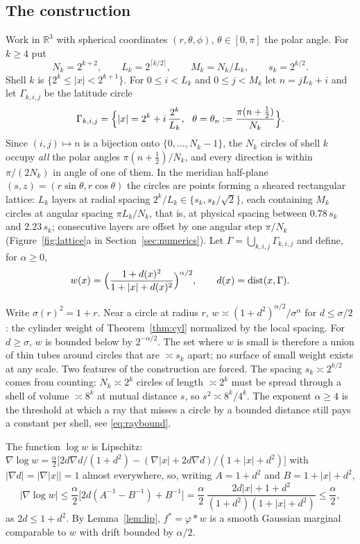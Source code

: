 \documentclass[11pt]{amsart}
\newcommand{\R}{\mathbb{R}}
\newcommand{\abs}[1]{\lvert #1\rvert}
\DeclareMathOperator{\dist}{dist}
\theoremstyle{plain}
\theoremstyle{definition}
\theoremstyle{remark}
\begin{document}
\subsection{The construction}\label{sec:construction}
Work in $\R^3$ with spherical coordinates $(r,\theta,\phi)$, $\theta\in[0,\pi]$
the polar angle. For $k\ge4$ put
\[
N_k=2^{k+2},\qquad L_k=2^{\lceil k/2\rceil},\qquad M_k=N_k/L_k,\qquad
s_k=2^{k/2}.
\]
Shell $k$ is $\{2^k\le\abs x<2^{k+1}\}$. For $0\le i<L_k$ and $0\le j<M_k$ let
$n=jL_k+i$ and let $\Gamma_{k,i,j}$ be the latitude circle
\[
\Gamma_{k,i,j}=\Bigl\{\abs x=2^k+i\,\frac{2^k}{L_k},\ \ \theta=\theta_n:=
\frac{\pi(n+\tfrac12)}{N_k}\Bigr\}.
\]
Since $(i,j)\mapsto n$ is a bijection onto $\{0,\dots,N_k-1\}$, the $N_k$
circles of shell $k$ occupy \emph{all} the polar angles $\pi(n+\frac12)/N_k$,
and every direction is within $\pi/(2N_k)$ in angle of one of them. In the
meridian half-plane $(s,z)=(r\sin\theta,r\cos\theta)$ the circles are points
forming a sheared rectangular lattice: $L_k$ layers at radial spacing
$2^k/L_k\in\{s_k,s_k/\sqrt2\}$, each containing $M_k$ circles at angular
spacing $\pi L_k/N_k$, that is, at physical spacing between $0.78\,s_k$ and
$2.23\,s_k$; consecutive layers are offset by one angular step $\pi/N_k$
(Figure~\ref{fig:lattice}a in Section~\ref{sec:numerics}). Let $\Gamma=\bigcup_{k,i,j}\Gamma_{k,i,j}$ and
define, for $\alpha\ge0$,
\begin{equation}\label{eq:w}
w(x)=\Bigl(\frac{1+d(x)^2}{1+\abs x+d(x)^2}\Bigr)^{\alpha/2},\qquad
d(x)=\dist(x,\Gamma).
\end{equation}

Write $\sigma(r)^2=1+r$. Near a circle at radius $r$,
$w\asymp(1+d^2)^{\alpha/2}/\sigma^\alpha$ for $d\le\sigma/2$: the cylinder weight of Theorem~\ref{thm:cyl} normalized by the
local spacing. For $d\ge\sigma$, $w$ is bounded below by $2^{-\alpha/2}$. The set
where $w$ is small is therefore a union of thin tubes around circles that are
$\asymp s_k$ apart; no surface of small weight exists at any scale. Two
features of the construction are forced. The spacing $s_k\asymp2^{k/2}$ comes
from counting: $N_k\asymp2^k$ circles of length $\asymp2^k$ must be spread
through a shell of volume $\asymp8^k$ at mutual distance $s$, so
$s^2\asymp8^k/4^k$. The exponent $\alpha\ge4$ is the threshold at which a ray
that misses a circle by a bounded distance still pays a constant per shell, see
\eqref{eq:raybound}.

The function $\log w$ is Lipschitz: $\nabla\log w=\frac{\alpha}{2}\bigl[
2d\nabla d/(1+d^2)-(\nabla\abs x+2d\nabla d)/(1+\abs x+d^2)\bigr]$ with
$\abs{\nabla d}=\abs{\nabla\abs x}=1$ almost everywhere, so, writing $A=1+d^2$
and $B=1+\abs x+d^2$,
\[
\abs{\nabla\log w}\le\frac{\alpha}{2}\bigl[2d(A^{-1}-B^{-1})+B^{-1}\bigr]
=\frac{\alpha}{2}\,\frac{2d\abs x+1+d^2}{(1+d^2)(1+\abs x+d^2)}\le\frac{\alpha}{2},
\]
as $2d\le1+d^2$. By Lemma~\ref{lem:lip}, $f^*=\varphi*w$ is a smooth Gaussian
marginal comparable to $w$ with drift bounded by $\alpha/2$.
\end{document}
